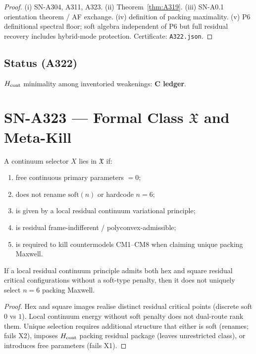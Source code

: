 \begin{proof}
(i) SN-A304, A311, A323. (ii) Theorem~\ref{thm:A319}. (iii) SN-A0.1 orientation theorem / AF exchange. (iv) definition of packing maximality. (v) P6 definitional spectral floor; soft algebra independent of P6 but full residual recovery includes hybrid-mode protection. Certificate: \texttt{A322.json}.
\end{proof}

\subsection*{Status (A322)}
$H_{\rm cont}$ minimality among inventoried weakenings: \textbf{C ledger}.

\section{SN-A323 --- Formal Class $\mathfrak{X}$ and Meta-Kill}
\label{sec:SN-A323}

\begin{definition}
\label{def:A323-X}
A continuum selector $X$ lies in $\mathfrak{X}$ if:
\begin{enumerate}[label=(X\arabic*)]
\item free continuous primary parameters $=0$;
\item does not rename $\mathrm{soft}(n)$ or hardcode $n=6$;
\item is given by a local residual continuum variational principle;
\item is residual frame-indifferent / polyconvex-admissible;
\item is required to kill countermodels CM1--CM8 when claiming unique packing Maxwell.
\end{enumerate}
\end{definition}

\begin{lemma}
\label{lem:A323}
If a local residual continuum principle admits both hex and square residual critical configurations without a soft-type penalty, then it does not uniquely select $n=6$ packing Maxwell.
\end{lemma}

\begin{proof}
Hex and square images realise distinct residual critical points (discrete soft $0$ vs $1$). Local continuum energy without soft penalty does not dual-route rank them. Unique selection requires additional structure that either is soft (renames; fails X2), imposes $H_{\rm cont}$ packing residual package (leaves unrestricted class), or introduces free parameters (fails X1).
\end{proof}

